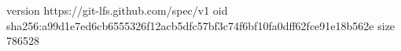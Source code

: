 version https://git-lfs.github.com/spec/v1
oid sha256:a99d1e7ed6cb6555326f12acb5dfc57bf3c74f6bf10fa0dff62fce91e18b562e
size 786528

